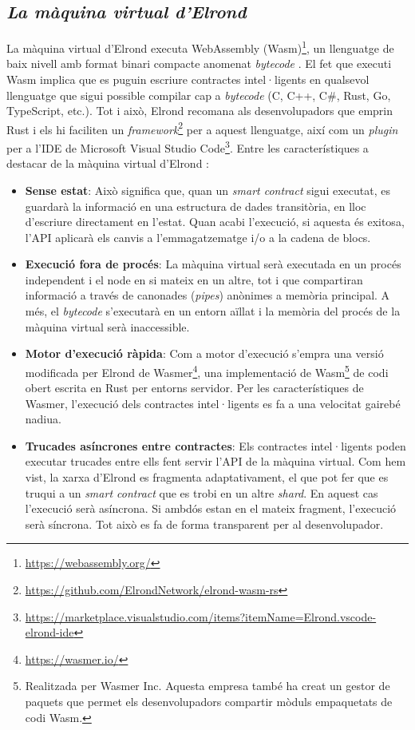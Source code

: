 \documentclass[11pt,a4paper]{article}
\begin{document}
\subsection{\textit{La màquina virtual d'Elrond}}
La màquina virtual d'Elrond executa WebAssembly (Wasm)\footnote{\url{https://webassembly.org/}}, un llenguatge de baix nivell amb format binari compacte anomenat \textit{bytecode} \cite{mozilla2021}. El fet que executi Wasm implica que es puguin escriure contractes intel·ligents en qualsevol llenguatge que sigui possible compilar cap a \textit{bytecode} (C, C++, C\#, Rust, Go, TypeScript, etc.). Tot i això, Elrond recomana als desenvolupadors que emprin Rust i els hi faciliten un \textit{framework}\footnote{\url{https://github.com/ElrondNetwork/elrond-wasm-rs}} per a aquest llenguatge, així com un \textit{plugin} per a l'IDE de Microsoft Visual Studio Code\footnote{\scriptsize\url{https://marketplace.visualstudio.com/items?itemName=Elrond.vscode-elrond-ide}}. Entre les característiques a destacar de la màquina virtual d'Elrond \cite{elrond2022}\cite{mincub2020}:
\begin{itemize}
	\item \textbf{Sense estat}: Això significa que, quan un \textit{smart contract} sigui executat, es guardarà la informació en una estructura de dades transitòria, en lloc d'escriure directament en l'estat. Quan acabi l'execució, si aquesta és exitosa, l'API aplicarà els canvis a l'emmagatzematge i/o a la cadena de blocs. 
	\item \textbf{Execució fora de procés}: La màquina virtual serà executada en un procés independent i el node en si mateix en un altre, tot i que compartiran informació a través de canonades (\textit{pipes}) anònimes a memòria principal.  A més, el \textit{bytecode} s'executarà en un entorn aïllat i la memòria del procés de la màquina virtual serà inaccessible.
	\item \textbf{Motor d'execució ràpida}: Com a motor d'execució s'empra una versió modificada per Elrond de Wasmer\footnote{\url{https://wasmer.io/}}, una implementació de Wasm\footnote{Realitzada per Wasmer Inc. Aquesta empresa també ha creat un gestor de paquets que permet els desenvolupadors compartir mòduls empaquetats de codi Wasm.} de codi obert escrita en Rust per entorns servidor. Per les característiques de Wasmer, l'execució dels contractes intel·ligents es fa a una velocitat gairebé nadiua.
	\item \textbf{Trucades asíncrones entre contractes}: Els contractes intel·ligents poden executar trucades entre ells fent servir l'API de la màquina virtual. Com hem vist, la xarxa d'Elrond es fragmenta adaptativament, el que pot fer que es truqui a un \textit{smart contract} que es trobi en un altre \textit{shard}. En aquest cas l'execució serà asíncrona. Si ambdós estan en el mateix fragment, l'execució serà síncrona. Tot això es fa de forma transparent per al desenvolupador.
\end{itemize}
\end{document}
